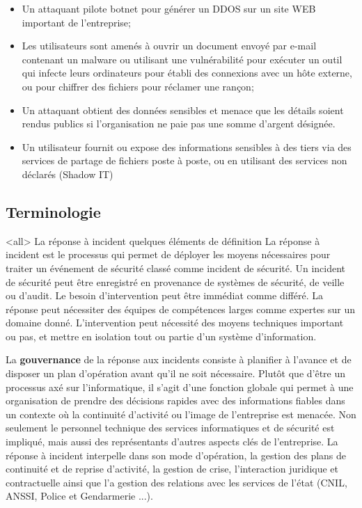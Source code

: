 \begin{itemize}
  \item Un attaquant pilote botnet pour générer un DDOS sur  un site WEB important de l'entreprise;
  \item Les utilisateurs sont amenés à ouvrir un document envoyé par e-mail contenant un malware ou utilisant une vulnérabilité pour exécuter un outil qui infecte leurs ordinateurs pour établi des connexions avec un hôte externe, ou pour chiffrer des fichiers pour réclamer une rançon;
  \item Un attaquant obtient des données sensibles et menace que les détails soient rendus publics si l'organisation ne paie pas une somme d'argent désignée.
  \item Un utilisateur fournit ou expose des informations sensibles à des tiers via des services de partage de fichiers poste à poste, ou en utilisant des services non déclarés (Shadow IT)
\end{itemize}


\subsection{Terminologie}

\mode<all>{\texframe
{La réponse à incident}
{quelques éléments de définition}
{%
La réponse à incident est le processus qui permet de déployer les moyens nécessaires pour traiter un événement de sécurité classé comme incident de sécurité.
Un incident de sécurité peut être enregistré en provenance de systèmes de sécurité, de veille ou d'audit. Le besoin d'intervention peut être immédiat comme différé.
La réponse peut nécessiter des équipes de compétences larges comme expertes sur un domaine donné. L'intervention peut nécessité des moyens techniques important ou pas, et mettre en isolation tout ou partie d'un système d'information.
}} %


La \textbf{gouvernance} de la réponse aux incidents consiste à planifier à l'avance et  de disposer un plan d'opération avant qu'il ne soit nécessaire. Plutôt que d'être un processus axé sur l'informatique, il s'agit d'une fonction  globale qui permet à une organisation de prendre des décisions rapides avec des informations fiables dans un contexte où la continuité d'activité ou l'image de l'entreprise est menacée. Non seulement le personnel technique des services informatiques et de sécurité est impliqué, mais aussi des représentants d'autres aspects clés de l'entreprise. La réponse à incident  interpelle  dans son mode d'opération, la gestion des plans de continuité et de reprise d'activité, la gestion de crise,  l'interaction juridique et contractuelle  ainsi que l'a gestion des relations avec les services de l'état (CNIL, ANSSI, Police et Gendarmerie ...). 

